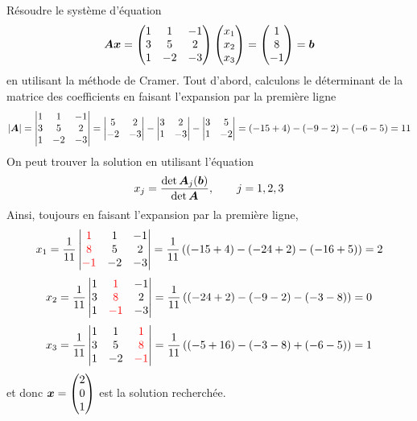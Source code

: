 \begin{exemple}
Résoudre le système d'équation
\[
\boldsymbol{A}\boldsymbol{x} = 
\begin{pmatrix}
1 & 1 & -1\\
3 & 5 & 2\\
1 & -2& -3
\end{pmatrix}
\begin{pmatrix}
x_1\\x_2\\x_3
\end{pmatrix}
=\begin{pmatrix}
1 \\ 8 \\ -1
\end{pmatrix}
=\boldsymbol{b}
\]
en utilisant la méthode de Cramer.
\solution
Tout d'abord, calculons le déterminant de la matrice des coefficients en faisant l'expansion
par la première ligne
\[
|\boldsymbol{A}| = \begin{vmatrix}
1 & 1 & -1\\
3 & 5 & 2\\
1 & -2& -3
\end{vmatrix}
= \begin{vmatrix}
5 & 2 \\
-2 & -3
\end{vmatrix}
- \begin{vmatrix}
3 & 2 \\
1 & -3
\end{vmatrix}
-\begin{vmatrix}
3 & 5 \\
1 & -2
\end{vmatrix}
= (-15+4) - (-9-2) - (-6-5) = 11
\]
On peut trouver la solution en utilisant l'équation
\[
x_j = \frac{\det \boldsymbol{A}_j(\boldsymbol{b})}{\det \boldsymbol{A}}, \qquad j=1, 2, 3
\]
Ainsi, toujours en faisant l'expansion par la première ligne,
\[
x_1 = \frac{1}{11}\begin{vmatrix}
\color{red} 1 & 1 & -1\\
\color{red}8 & 5 & 2\\
\color{red}-1 & -2& -3
\end{vmatrix}
= \frac{1}{11}\left( (-15+4) - (-24+2) -(-16+5)\right) = 2
\]
\[
x_2 = \frac{1}{11}\begin{vmatrix}
1& \color{red} 1 & -1\\
3& \color{red}8 & 2\\
1& \color{red}-1 & -3
\end{vmatrix}
= \frac{1}{11}\left( (-24+2) - (-9-2) -(-3-8)\right) = 0
\]
\[
x_3 = \frac{1}{11}\begin{vmatrix}
1& 1& \color{red} 1 \\
3& 5& \color{red}8\\
1& -2& \color{red}-1 
\end{vmatrix}
= \frac{1}{11}\left( (-5+16) - (-3-8) +(-6-5)\right) = 1
\]
et donc $\boldsymbol{x} = \displaystyle\begin{pmatrix}
2\\0\\1
\end{pmatrix}$ est la solution recherchée.
\end{exemple}

